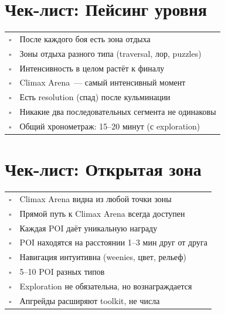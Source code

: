 \documentclass[a4paper,11pt]{report}
\begin{document}
\section{Чек-лист: Пейсинг уровня}

\begin{table}[H]
\centering
\begin{tabularx}{\textwidth}{@{}cX@{}}
\toprule
$\square$ & После каждого боя есть зона отдыха \\
$\square$ & Зоны отдыха разного типа (traversal, лор, puzzles) \\
$\square$ & Интенсивность в целом растёт к финалу \\
$\square$ & Climax Arena~--- самый интенсивный момент \\
$\square$ & Есть resolution (спад) после кульминации \\
$\square$ & Никакие два последовательных сегмента не одинаковы \\
$\square$ & Общий хронометраж: 15--20 минут (с exploration) \\
\bottomrule
\end{tabularx}
\end{table}

\section{Чек-лист: Открытая зона}

\begin{table}[H]
\centering
\begin{tabularx}{\textwidth}{@{}cX@{}}
\toprule
$\square$ & Climax Arena видна из любой точки зоны \\
$\square$ & Прямой путь к Climax Arena всегда доступен \\
$\square$ & Каждая POI даёт уникальную награду \\
$\square$ & POI находятся на расстоянии 1--3 мин друг от друга \\
$\square$ & Навигация интуитивна (weenies, цвет, рельеф) \\
$\square$ & 5--10 POI разных типов \\
$\square$ & Exploration не обязательна, но вознаграждается \\
$\square$ & Апгрейды расширяют toolkit, не числа \\
\bottomrule
\end{tabularx}
\end{table}


\end{document}
